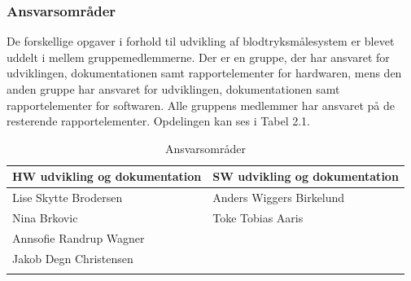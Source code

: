 \subsubsection{Ansvarsområder}
De forskellige opgaver i forhold til udvikling af blodtryksmålesystem er blevet uddelt i mellem gruppemedlemmerne. Der er en gruppe, der har ansvaret for udviklingen, dokumentationen samt rapportelementer for hardwaren, mens den anden gruppe har ansvaret for udviklingen, dokumentationen samt rapportelementer for softwaren. Alle gruppens medlemmer har ansvaret på de resterende rapportelementer. Opdelingen kan ses i Tabel 2.1.    

\begin{longtabu} to 
	\textbf{HW udvikling og dokumentation} & \textbf{SW udvikling og dokumentation} \\[-1ex]
	\midrule
	Lise Skytte Brodersen & Anders Wiggers Birkelund\\[-1ex]
	Nina Brkovic & Toke Tobias Aaris \\[-1ex]
	Annsofie Randrup Wagner & \\[-1ex]
	Jakob Degn Christensen & \\[-1ex]

	\caption{Ansvarsområder}
\end{longtabu}



